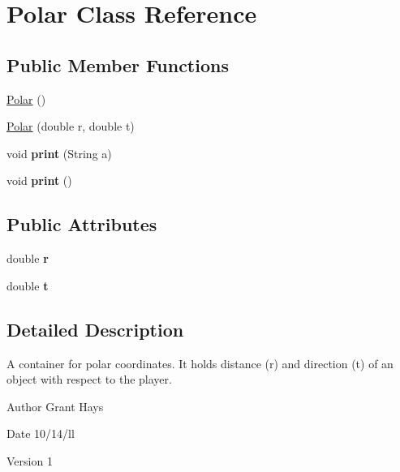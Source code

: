 \hypertarget{classPolar}{
\section{Polar Class Reference}
\label{classPolar}
}
\subsection*{Public Member Functions}
\begin{DoxyCompactItemize}
\item 
\hyperlink{classPolar_afbda96284f663a1aa55dd27e08898b56}{Polar} ()
\item 
\hyperlink{classPolar_a823d32fc756d8a60f4e684a9e878b638}{Polar} (double r, double t)
\item 
\hypertarget{classPolar_a1f31a0c3e479ce005f1147bda2878336}{
void {\bfseries print} (String a)}
\label{classPolar_a1f31a0c3e479ce005f1147bda2878336}

\item 
\hypertarget{classPolar_ac503c017486e75e709fcee7bf8b0640c}{
void {\bfseries print} ()}
\label{classPolar_ac503c017486e75e709fcee7bf8b0640c}

\end{DoxyCompactItemize}
\subsection*{Public Attributes}
\begin{DoxyCompactItemize}
\item 
\hypertarget{classPolar_a0f3380d5ee95a3186aff00bffb60be18}{
double {\bfseries r}}
\label{classPolar_a0f3380d5ee95a3186aff00bffb60be18}

\item 
\hypertarget{classPolar_a727459102335bd6b3b70e6a22d2e0a7f}{
double {\bfseries t}}
\label{classPolar_a727459102335bd6b3b70e6a22d2e0a7f}

\end{DoxyCompactItemize}


\subsection{Detailed Description}
A container for polar coordinates. It holds distance (r) and direction (t) of an object with respect to the player.

\begin{DoxyAuthor}{Author}
Grant Hays 
\end{DoxyAuthor}
\begin{DoxyDate}{Date}
10/14/ll 
\end{DoxyDate}
\begin{DoxyVersion}{Version}
1 
\end{DoxyVersion}


